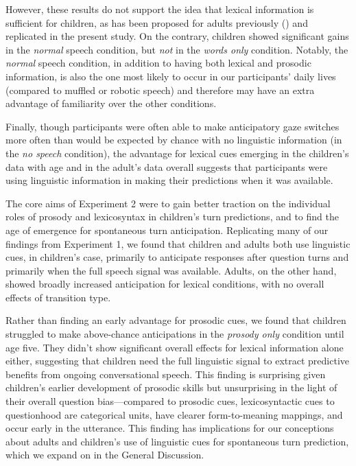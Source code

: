 \documentclass[authoryear, 12pt]{elsarticle}
\begin{document}
However, these results do not support the idea that lexical information is sufficient for children, as has been proposed for adults previously (\citealp{de-ruiter2006}) and replicated in the present study. On the contrary, children showed significant gains in the \textit{normal} speech condition, but \textit{not} in the \textit{words only} condition. Notably, the \textit{normal} speech condition, in addition to having both lexical and prosodic information, is also the one most likely to occur in our participants' daily lives (compared to muffled or robotic speech) and therefore may have an extra advantage of familiarity over the other conditions.

Finally, though participants were often able to make anticipatory gaze switches more often than would be expected by chance with no linguistic information (in the \textit{no speech} condition), the advantage for lexical cues emerging in the children's data with age and in the adult's data overall suggests that participants were using linguistic information in making their predictions when it was available.

The core aims of Experiment 2 were to gain better traction on the individual roles of prosody and lexicosyntax in children's turn predictions, and to find the age of emergence for spontaneous turn anticipation. Replicating many of our findings from Experiment 1, we found that children and adults both use linguistic cues, in children's case, primarily to anticipate responses after question turns and primarily when the full speech signal was available. Adults, on the other hand, showed broadly increased anticipation for lexical conditions, with no overall effects of transition type.

Rather than finding an early advantage for prosodic cues, we found that children struggled to make above-chance anticipations in the \textit{prosody only} condition until age five. They didn't show significant overall effects for lexical information alone either, suggesting that children need the full linguistic signal to extract predictive benefits from ongoing conversational speech. This finding is surprising given children's earlier development of prosodic skills but unsurprising in the light of their overall question bias---compared to prosodic cues, lexicosyntactic cues to questionhood are categorical units, have clearer form-to-meaning mappings, and occur early in the utterance. This finding has implications for our conceptions about adults and children's use of linguistic cues for spontaneous turn prediction, which we expand on in the General Discussion.
\end{document}
